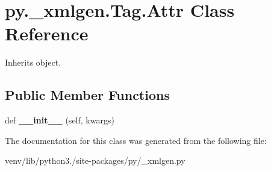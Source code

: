 \hypertarget{classpy_1_1__xmlgen_1_1_tag_1_1_attr}{}\section{py.\+\_\+xmlgen.\+Tag.\+Attr Class Reference}
\label{classpy_1_1__xmlgen_1_1_tag_1_1_attr}


Inherits object.

\subsection*{Public Member Functions}
\begin{DoxyCompactItemize}
\item 
\mbox{\label{classpy_1_1__xmlgen_1_1_tag_1_1_attr_a48ad44110bd067f335d86d6a495874a5}} 
def {\bfseries \+\_\+\+\_\+init\+\_\+\+\_\+} (self, kwargs)
\end{DoxyCompactItemize}


The documentation for this class was generated from the following file\+:\begin{DoxyCompactItemize}
\item 
venv/lib/python3./site-\/packages/py/\+\_\+xmlgen.\+py\end{DoxyCompactItemize}

